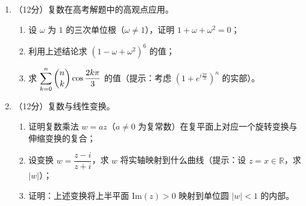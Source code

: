 \documentclass[12pt, a4paper]{ctexart}
\begin{document}
\begin{enumerate}[resume]
\item （12分）复数在高考解题中的高观点应用。

\begin{enumerate}[label=(\arabic*)]
    \item 设 $\omega$ 为 $1$ 的三次单位根（$\omega\neq 1$），证明 $1+\omega+\omega^2=0$；
    \item 利用上述结论求 $\left(1-\omega+\omega^2\right)^6$ 的值；
    \item 求 $\displaystyle\sum_{k=0}^{n}\dbinom{n}{k}\cos\dfrac{2k\pi}{3}$ 的值（提示：考虑 $(1+e^{i\frac{2\pi}{3}})^n$ 的实部）。
\end{enumerate}

\item （12分）复数与线性变换。

\begin{enumerate}[label=(\arabic*)]
    \item 证明复数乘法 $w=az$（$a\neq 0$ 为复常数）在复平面上对应一个旋转变换与伸缩变换的复合；
    \item 设变换 $w=\dfrac{z-i}{z+i}$，求 $w$ 将实轴映射到什么曲线（提示：设 $z=x\in\mathbb{R}$，求 $|w|$）；
    \item 证明：上述变换将上半平面 $\text{Im}(z)>0$ 映射到单位圆 $|w|<1$ 的内部。
\end{enumerate}

\end{enumerate}
\end{document}
